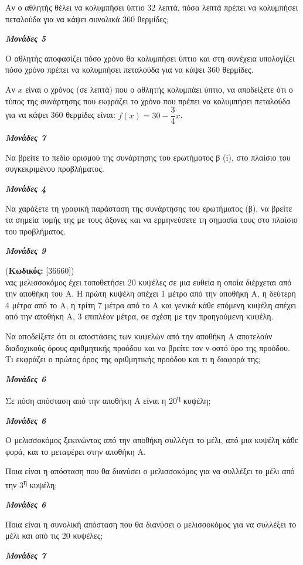 \documentclass[11pt,a4paper,twoside]{book}
\newcounter{askhsh}[chapter]
\renewcommand{\theaskhsh}{
	\bf{\titlefont{\Large{\thechapter}}.\arabic{askhsh}}
}
\newcommand{\Askhsh}[2]{\refstepcounter{askhsh}{\titlefont{Άσκηση\theaskhsh} - \textcolor{maincolor}{ΘΕΜΑ #2}} (\small{\textbf{Κωδικός:} #1})\\}{}
\newcommand{\monades}[1]{
\hspace*{\fill}
\textbf{\textit{\textcolor{maincolor}{Μονάδες #1}}}}
\begin{document}
\begin{alist}
\item Αν ο αθλητής θέλει να κολυμπήσει ύπτιο 32 λεπτά, πόσα λεπτά πρέπει να κολυμπήσει πεταλούδα για να κάψει συνολικά 360 θερμίδες;

\monades{5}
\item Ο αθλητής αποφασίζει πόσο χρόνο θα κολυμπήσει ύπτιο και στη συνέχεια υπολογίζει πόσο χρόνο πρέπει να κολυμπήσει πεταλούδα για να κάψει 360 θερμίδες.

\end{alist}
\begin{alist}
\item
  Αν $x$ είναι ο χρόνος (σε λεπτά) που ο αθλητής κολυμπάει ύπτιο, να αποδείξετε ότι ο τύπος της συνάρτησης που εκφράζει το χρόνο που πρέπει να κολυμπήσει πεταλούδα για να κάψει 360 θερμίδες είναι: $f(x) = 30 - \dfrac{3}{4}x$.
\monades{7}
\end{alist}
\begin{alist}
\item
  Να βρείτε το πεδίο ορισμού της συνάρτησης του ερωτήματος β (i), στο πλαίσιο του συγκεκριμένου προβλήματος.
\monades{4}
\item Να χαράξετε τη γραφική παράσταση της συνάρτησης του ερωτήματος (β), να βρείτε τα σημεία τομής της με τους άξονες και να ερμηνεύσετε τη σημασία τους στο πλαίσιο του προβλήματος.
\monades{9}
\end{alist}

\vspace{4mm}

\Askhsh{[36660]}
Ένας μελισσοκόμος έχει τοποθετήσει 20 κυψέλες σε μια ευθεία η οποία διέρχεται από την αποθήκη του Α. Η πρώτη κυψέλη απέχει 1 μέτρο από την αποθήκη Α, η δεύτερη 4 μέτρα από το Α, η τρίτη 7 μέτρα από το Α και γενικά κάθε επόμενη κυψέλη απέχει από την αποθήκη Α, 3 επιπλέον μέτρα, σε σχέση με την προηγούμενη κυψέλη.

\begin{alist}
\item Να αποδείξετε ότι οι αποστάσεις των κυψελών από την αποθήκη Α αποτελούν διαδοχικούς όρους αριθμητικής προόδου και να βρείτε τον ν-οστό όρο της προόδου. Τι εκφράζει ο πρώτος όρος της αριθμητικής προόδου και τι η διαφορά της;

\monades{6}
\item Σε πόση απόσταση από την αποθήκη Α είναι η 20\textsuperscript{η} κυψέλη;
\monades{6}
\item Ο μελισσοκόμος ξεκινώντας από την αποθήκη συλλέγει το μέλι, από μια κυψέλη κάθε φορά, και το μεταφέρει στην αποθήκη Α.

\end{alist}
\begin{alist}
\item
  Ποια είναι η απόσταση που θα διανύσει ο μελισσοκόμος για να συλλέξει το μέλι από την 3\textsuperscript{η} κυψέλη;
\monades{6}
\end{alist}
\begin{alist}
\item
  Ποια είναι η συνολική απόσταση που θα διανύσει ο μελισσοκόμος για να συλλέξει το μέλι και από τις 20 κυψέλες;
\monades{7}
\end{alist}
\end{document}
